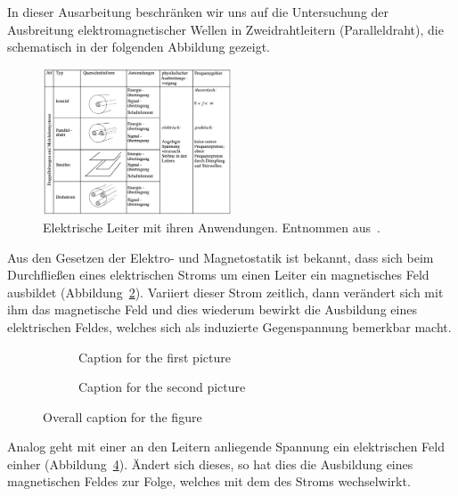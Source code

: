 \documentclass[paper=a4, parskip=half-, ngerman, fontsize=11pt]{scrreprt}
\begin{document}
In dieser Ausarbeitung beschränken wir uns auf die Untersuchung der Ausbreitung elektromagnetischer Wellen in
Zweidrahtleitern (Paralleldraht), die schematisch in der folgenden Abbildung gezeigt.
\begin{figure}[!h]
    \begin{center}
        \includegraphics[width=0.5\textwidth]{images/Leiter.png}
        \caption{Elektrische Leiter mit ihren Anwendungen. Entnommen aus~\cite{FernuniSkript}.}
        \label{Leiter}
    \end{center}
\end{figure}

Aus den Gesetzen der Elektro- und Magnetostatik ist bekannt, dass sich beim Durchfließen eines elektrischen Stroms um
einen Leiter ein magnetisches Feld ausbildet (Abbildung~\ref{Felder1}). Variiert dieser Strom zeitlich, dann
verändert sich mit ihm das magnetische Feld und dies wiederum bewirkt die Ausbildung eines elektrischen Feldes, welches
sich als induzierte Gegenspannung bemerkbar macht.
\begin{figure}[!ht]
    \begin{subfigure}[b]{0.49\textwidth}
        \centering
        
        \caption{\color{red}Caption for the first picture}
        \label{Felder1}
    \end{subfigure}%
    \hfill
    \begin{subfigure}[b]{0.49\textwidth}
        \centering
        
        \caption{\color{red}Caption for the second picture}
        \label{Felder2}
    \end{subfigure}
    \caption{\color{red}Overall caption for the figure}
\end{figure}
Analog geht mit einer an den Leitern anliegende Spannung ein elektrischen Feld einher (Abbildung~\ref{Felder2}).
Ändert sich dieses, so hat dies die Ausbildung eines magnetischen Feldes zur Folge, welches mit dem des Stroms
wechselwirkt.
\end{document}
